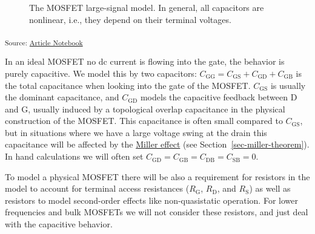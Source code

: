 \documentclass[
  a4paper,
  DIV=11,
  numbers=noendperiod]{scrartcl}
\begin{document}
\begin{figure}[H]


\caption{\label{fig-mosfet-large-signal-model}The MOSFET large-signal
model. In general, all capacitors are nonlinear, i.e., they depend on
their terminal voltages.}

\end{figure}%

\textsubscript{Source:
\href{https://iic-jku.github.io/analog-circuit-design/index.qmd.html}{Article
Notebook}}

In an ideal MOSFET no dc current is flowing into the gate, the behavior
is purely capacitive. We model this by two capacitors:
\(C_\mathrm{GG}= C_\mathrm{GS}+ C_\mathrm{GD}+ C_\mathrm{GB}\) is the
total capacitance when looking into the gate of the MOSFET.
\(C_\mathrm{GS}\) is usually the dominant capacitance, and
\(C_\mathrm{GD}\) models the capacitive feedback between D and G,
usually induced by a topological overlap capacitance in the physical
construction of the MOSFET. This capacitance is often small compared to
\(C_\mathrm{GS}\), but in situations where we have a large voltage swing
at the drain this capacitance will be affected by the
\href{https://en.wikipedia.org/wiki/Miller_effect}{Miller effect} (see
Section~\ref{sec-miller-theorem}). In hand calculations we will often
set \(C_\mathrm{GD}= C_\mathrm{GB}= C_\mathrm{DB}= C_\mathrm{SB}= 0\).

To model a physical MOSFET there will be also a requirement for
resistors in the model to account for terminal access resistances
(\(R_\mathrm{G}\), \(R_\mathrm{D}\), and \(R_\mathrm{S}\)) as well as
resistors to model second-order effects like non-quasistatic operation.
For lower frequencies and bulk MOSFETs we will not consider these
resistors, and just deal with the capacitive behavior.
\end{document}
